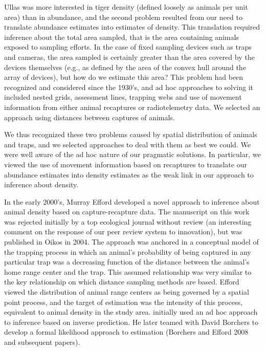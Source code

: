 Ullas was more interested in tiger density (defined
loosely as animals per unit area) than in abundance, and the second
problem resulted from our need to translate abundance estimates into
estimates of density.  This translation required inference about the
total area sampled, that is the area containing animals exposed to
sampling efforts. In the case of fixed sampling devices such as traps
and cameras, the area sampled is certainly greater than the area
covered by the devices themselves (e.g., as defined by the area of the
convex hull around the array of devices), but how do we estimate this
area?  This problem had been recognized and considered since the
1930's, and ad hoc approaches to solving it included nested grids,
assessment lines, trapping webs and use of movement information from
either animal recaptures or radiotelemetry data. We selected an
approach using distances between captures of animals.  

We thus
recognized these two problems caused by spatial distribution of
animals and traps, and we selected approaches to deal with them as
best we could. We were well aware of the ad hoc nature of our
pragmatic solutions. In particular, we viewed the use of movement
information based on recaptures to translate our abundance estimates
into density estimates as the weak link in our approach to inference
about density. 

 In the early 2000's, Murray Efford developed a novel
approach to inference about animal density based on capture-recapture
data. The manuscript on this work was rejected initially by a top
ecological journal without review (an interesting comment on the
response of our peer review system to innovation), but was published
in Oikos in 2004. The approach was anchored in a conceptual model of
the trapping process in which an animal's probability of being
captured in any particular trap was a decreasing function of the
distance between the animal's home range center and the trap. This
assumed relationship was very similar to the key relationship on which
distance sampling methods are based. Efford viewed the distribution of
animal range centers as being governed by a spatial point process, and
the target of estimation was the intensity of this process, equivalent
to animal density in the study area. \citet{efford:2004}
initially used an
ad hoc approach to inference based on inverse prediction. He later
teamed with David Borchers to develop a formal likelihood approach to
estimation (Borchers and Efford 2008 and subsequent papers).  


